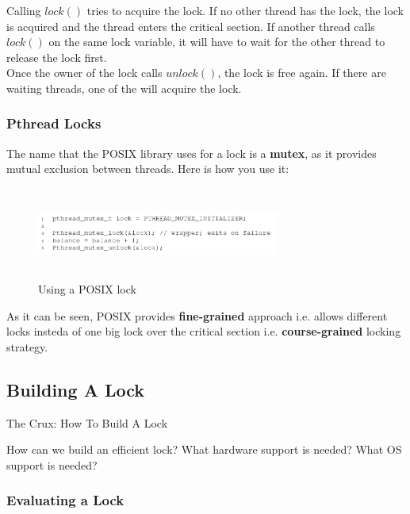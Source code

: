 Calling $lock()$ tries to acquire the lock. If no other thread has the lock, 
the lock is acquired and the thread enters the critical section. If another
thread calls $lock()$ on the same lock variable, it will have to wait for the
other thread to release the lock first.\\

Once the owner of the lock calls $unlock()$, the lock is free again. If there
are waiting threads, one of the will acquire the lock.

\subsubsection{Pthread Locks}

The name that the POSIX library uses for a lock is a \textbf{mutex}, as it 
provides mutual exclusion between threads. Here is how you use it:

\begin{figure}[h!]
    \begin{center}
        \includegraphics[width=8cm, height=3cm]{img/plocks.png}
        \caption{Using a POSIX lock}
    \end{center}
\end{figure}

As it can be seen, POSIX provides \textbf{fine-grained} approach i.e. allows 
different locks insteda of one big lock over the critical section i.e. 
\textbf{course-grained} locking strategy. 

\subsection{Building A Lock}

\begin{tcolorbox}
    \begin{center}
        The Crux: How To Build A Lock
    \end{center}

    How can we build an efficient lock? What hardware support is needed? What OS
    support is needed?
\end{tcolorbox}

\subsubsection{Evaluating a Lock}


